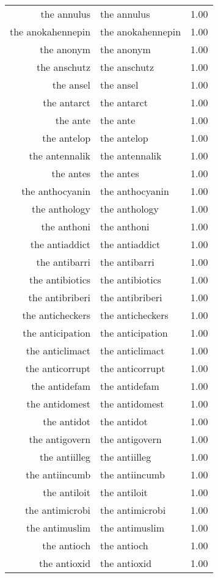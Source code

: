 \begin{table}[ht]
\begin{tabular}{rlr}
  the annulus & the annulus & 1.00 \\ 
  the anokahennepin & the anokahennepin & 1.00 \\ 
  the anonym & the anonym & 1.00 \\ 
  the anschutz & the anschutz & 1.00 \\ 
  the ansel & the ansel & 1.00 \\ 
  the antarct & the antarct & 1.00 \\ 
  the ante & the ante & 1.00 \\ 
  the antelop & the antelop & 1.00 \\ 
  the antennalik & the antennalik & 1.00 \\ 
  the antes & the antes & 1.00 \\ 
  the anthocyanin & the anthocyanin & 1.00 \\ 
  the anthology & the anthology & 1.00 \\ 
  the anthoni & the anthoni & 1.00 \\ 
  the antiaddict & the antiaddict & 1.00 \\ 
  the antibarri & the antibarri & 1.00 \\ 
  the antibiotics & the antibiotics & 1.00 \\ 
  the antibriberi & the antibriberi & 1.00 \\ 
  the anticheckers & the anticheckers & 1.00 \\ 
  the anticipation & the anticipation & 1.00 \\ 
  the anticlimact & the anticlimact & 1.00 \\ 
  the anticorrupt & the anticorrupt & 1.00 \\ 
  the antidefam & the antidefam & 1.00 \\ 
  the antidomest & the antidomest & 1.00 \\ 
  the antidot & the antidot & 1.00 \\ 
  the antigovern & the antigovern & 1.00 \\ 
  the antiilleg & the antiilleg & 1.00 \\ 
  the antiincumb & the antiincumb & 1.00 \\ 
  the antiloit & the antiloit & 1.00 \\ 
  the antimicrobi & the antimicrobi & 1.00 \\ 
  the antimuslim & the antimuslim & 1.00 \\ 
  the antioch & the antioch & 1.00 \\ 
  the antioxid & the antioxid & 1.00 \\ 

\end{tabular}
\end{table}
